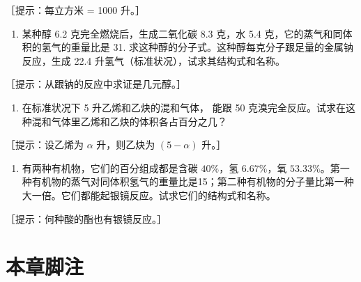 ［提示：每立方米 = 1000 升。］

\begin{enumerate}[start=18]
\item
  某种醇 6.2 克完全燃烧后，生成二氧化碳 8.3 克，水 5.4
  克，它的蒸气和同体积的氢气的重量比是 31.
  求这种醇的分子式。这种醇每克分子跟足量的金属钠反应，生成 22.4
  升氢气（标准状况），试求其结构式和名称。
\end{enumerate}

［提示：从跟钠的反应中求证是几元醇。］

\begin{enumerate}[start=19]
\item
  在标准状况下 5 升乙烯和乙炔的混和气体， 能跟 50
  克溴完全反应。试求在这种混和气体里乙烯和乙炔的体积各占百分之几？
\end{enumerate}

［提示：设乙烯为 \(\alpha\) 升，则乙炔为 \((5-\alpha)\) 升。］

\begin{enumerate}[start=20]
\item
  有两种有机物，它们的百分组成都是含碳 \(40\%\)，氢 \(6.67\%\)，氧
  \(53.33\%\)。第一种有机物的蒸气对同体积氢气的重量比是15；第二种有机物的分子量比第一种大一倍。它们都能起银镜反应。试求它们的结构式和名称。
\end{enumerate}

［提示：何种酸的酯也有银镜反应。］

\section{本章脚注}

